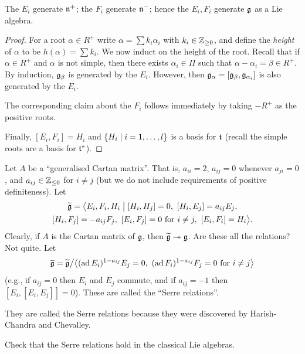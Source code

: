 \begin{lemma}
The $E_i$ generate $\mathfrak{n}^+$; the $F_i$ generate $\mathfrak{n}^-$; hence the $E_i, F_i$
generate $\mathfrak{g}$ as a Lie algebra.
\end{lemma}

\begin{proof}
For a root $\alpha \in R^+$ write $\alpha = \sum k_i\alpha_i$ with
$k_i \in \mathbb{Z}_{\geq 0}$, and define the \emph{height} of $\alpha$ to be
$h(\alpha) = \sum k_i$. We now induct on the height of the root. Recall that if
$\alpha \in R^+$ and $\alpha$ is not simple, then there exists
$\alpha_i \in \Pi$ such that $\alpha - \alpha_i = \beta \in R^+$. By induction,
$\mathfrak{g}_\beta$ is generated by the $E_i$. However, then
$\mathfrak{g}_\alpha = [\mathfrak{g}_\beta, \mathfrak{g}_{\alpha_i}]$ is also generated by the $E_i$.

The corresponding claim about the $F_i$ follows immediately by taking $-R^+$ as
the positive roots.

Finally, $[E_i, F_i] = H_i$ and $\{H_i \mid i = 1, \dots, l\}$ is a basis for
$\mathfrak{t}$ (recall the simple roots are a basis for $\mathfrak{t}^*$).
\end{proof}

Let $A$ be a ``generalised Cartan matrix''. That is, $a_{ii} = 2$,
$a_{ij} = 0$ whenever $a_{ji} = 0$, and $a_{ij} \in \mathbb{Z}_{\leq 0}$ for
$i \neq j$ (but we do not include requirements of positive definiteness). Let
\begin{multline*}
  \gtil = \bigl\langle E_i, F_i, H_i \bigm| [H_i, H_j] = 0,\ [H_i, E_j] = a_{ij}E_j,\\
    [H_i, F_j] = -a_{ij}F_j,\ [E_i, F_j] = 0 \text{ for } i \neq j,\ [E_i, F_i] = H_i\bigr\rangle.
\end{multline*}
Clearly, if $A$ is the Cartan matrix of $\mathfrak{g}$, then $\widetilde{\mathfrak{g}} \twoheadrightarrow \mathfrak{g}$.
Are these all the relations? Not quite. Let
\[
  \overline{\mathfrak{g}} = \widetilde{\mathfrak{g}}\big/\bigl\langle (\operatorname{ad} E_i)^{1 - a_{ij}}E_j = 0,\
    (\operatorname{ad} F_i)^{1 - a_{ij}}F_j = 0 \text{ for } i \neq j\bigr\rangle
\]
(e.g., if $a_{ij} = 0$ then $E_i$ and $E_j$ commute, and if $a_{ij} = -1$ then
$[E_i, [E_i, E_j]] = 0$). These are called the ``Serre relations''.

\begin{remark}
They are called the Serre relations because they were discovered by
Harish-Chandra and Chevalley.
\end{remark}

\begin{exercise}
Check that the Serre relations hold in the classical Lie algebras.
\end{exercise}

